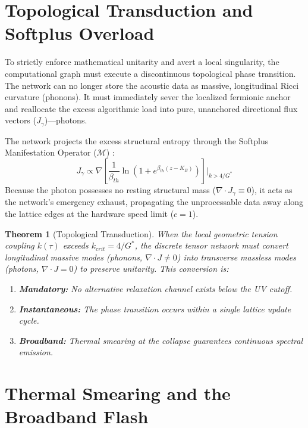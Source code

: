 \documentclass[11pt, letterpaper]{article}
\newcommand{\G}{G^*}
\newtheorem{theorem}{Theorem}[section]
\theoremstyle{definition}
\theoremstyle{remark}
\begin{document}
\section{Topological Transduction and Softplus Overload}

To strictly enforce mathematical unitarity and avert a local singularity, the computational graph must execute a discontinuous topological phase transition. The network can no longer store the acoustic data as massive, longitudinal Ricci curvature (phonons). It must immediately sever the localized fermionic anchor and reallocate the excess algorithmic load into pure, unanchored directional flux vectors ($J_{\gamma}$)---photons.

The network projects the excess structural entropy through the Softplus Manifestation Operator ($\mathcal{M}$) \cite{Landau1980}:
\begin{equation}
    J_{\gamma} \propto \nabla \left[ \frac{1}{\beta_{th}} \ln\left(1 + e^{\beta_{th} (z - K_B)}\right) \right] \Bigg|_{k > 4/\G}
\end{equation}
Because the photon possesses no resting structural mass ($\nabla \cdot J_{\gamma} \equiv 0$), it acts as the network's emergency exhaust, propagating the unprocessable data away along the lattice edges at the hardware speed limit ($c=1$).

\begin{theorem}[Topological Transduction]
When the local geometric tension coupling $k(\tau)$ exceeds $k_{crit} = 4/\G$, the discrete tensor network must convert longitudinal massive modes (phonons, $\nabla \cdot J \neq 0$) into transverse massless modes (photons, $\nabla \cdot J = 0$) to preserve unitarity. This conversion is:
\begin{enumerate}[noitemsep]
    \item \textbf{Mandatory:} No alternative relaxation channel exists below the UV cutoff.
    \item \textbf{Instantaneous:} The phase transition occurs within a single lattice update cycle.
    \item \textbf{Broadband:} Thermal smearing at the collapse guarantees continuous spectral emission.
\end{enumerate}
\end{theorem}

\section{Thermal Smearing and the Broadband Flash}
\end{document}
